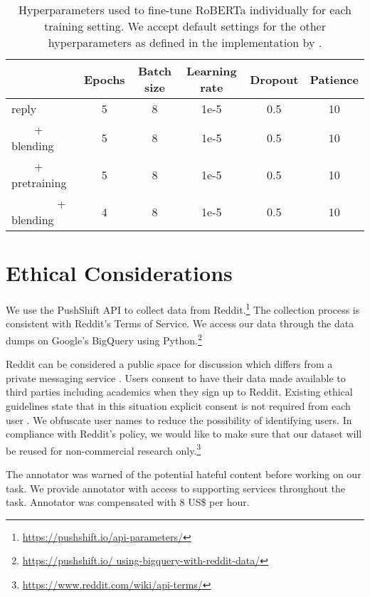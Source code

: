 \documentclass[11pt]{article}
\begin{document}
\begin{table*}
	\centering
	\small
	\begin{tabular}{lccccc}
		\toprule
		& Epochs & Batch size & Learning rate & Dropout & Patience \\
		\midrule
		reply &  5 & 8 & 1e-5 & 0.5 & 10 \\
		~~~~+ blending & 5 & 8 &  1e-5 & 0.5 & 10 \\
		~~~~+ pretraining & 5 & 8 &  1e-5 & 0.5 & 10\\
		~~~~~~~~+ blending & 4 & 8 &  1e-5 & 0.5 & 10  \\
		\bottomrule
		
	\end{tabular}
	\caption{Hyperparameters used to fine-tune RoBERTa individually for each training setting. We accept default settings for the other hyperparameters as defined in the implementation by \citet{phang2020jiant}. }
	\label{t:hyperparameters}
\end{table*}

\section{Ethical Considerations}
\label{sec:appendix}
We use the PushShift API to collect data from Reddit.\footnote{\url{https://pushshift.io/api-parameters/}} 
The collection process is consistent with Reddit's Terms of Service. 
We access our data through the data dumps on Google's BigQuery using Python.\footnote{\url{https://pushshift.io/
		using-bigquery-with-reddit-data/}} 

Reddit can be considered a public space for discussion which differs from a private messaging service \cite{vidgen-etal-2021-introducing}. 
Users consent to have their data made available to third parties including academics when they sign up to Reddit. 
Existing ethical guidelines state that in this situation explicit consent is not required from each user \cite{DBLP:conf/tto/ProcterWBHEWJ19}. 
We obfuscate user names to reduce the possibility of identifying users. 
In compliance with Reddit's policy, we would like to make sure that our dataset will be reused for non-commercial research only.\footnote{\url{https://www.reddit.com/wiki/api-terms/}}

The annotator was warned of the potential hateful content before working on our task. 
We provide annotator with access to supporting services throughout the task.
Annotator was compensated with 8 US\$ per hour.
\end{document}
